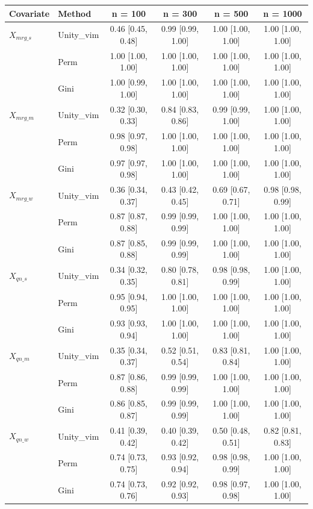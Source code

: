 
\begin{tabular}{llcccc}
\toprule
Covariate & Method & n = 100 & n = 300 & n = 500 & n = 1000\\
\midrule
$X_{mrg\_s}$ & Unity\_vim & 0.46 [0.45, 0.48] & 0.99 [0.99, 1.00] & 1.00 [1.00, 1.00] & 1.00 [1.00, 1.00]\\
 & Perm & 1.00 [1.00, 1.00] & 1.00 [1.00, 1.00] & 1.00 [1.00, 1.00] & 1.00 [1.00, 1.00]\\
 & Gini & 1.00 [0.99, 1.00] & 1.00 [1.00, 1.00] & 1.00 [1.00, 1.00] & 1.00 [1.00, 1.00]\\
$X_{mrg\_m}$ & Unity\_vim & 0.32 [0.30, 0.33] & 0.84 [0.83, 0.86] & 0.99 [0.99, 1.00] & 1.00 [1.00, 1.00]\\
 & Perm & 0.98 [0.97, 0.98] & 1.00 [1.00, 1.00] & 1.00 [1.00, 1.00] & 1.00 [1.00, 1.00]\\
 & Gini & 0.97 [0.97, 0.98] & 1.00 [1.00, 1.00] & 1.00 [1.00, 1.00] & 1.00 [1.00, 1.00]\\
$X_{mrg\_w}$ & Unity\_vim & 0.36 [0.34, 0.37] & 0.43 [0.42, 0.45] & 0.69 [0.67, 0.71] & 0.98 [0.98, 0.99]\\
 & Perm & 0.87 [0.87, 0.88] & 0.99 [0.99, 0.99] & 1.00 [1.00, 1.00] & 1.00 [1.00, 1.00]\\
 & Gini & 0.87 [0.85, 0.88] & 0.99 [0.99, 0.99] & 1.00 [1.00, 1.00] & 1.00 [1.00, 1.00]\\
$X_{qn\_s}$ & Unity\_vim & 0.34 [0.32, 0.35] & 0.80 [0.78, 0.81] & 0.98 [0.98, 0.99] & 1.00 [1.00, 1.00]\\
 & Perm & 0.95 [0.94, 0.95] & 1.00 [1.00, 1.00] & 1.00 [1.00, 1.00] & 1.00 [1.00, 1.00]\\
 & Gini & 0.93 [0.93, 0.94] & 1.00 [1.00, 1.00] & 1.00 [1.00, 1.00] & 1.00 [1.00, 1.00]\\
$X_{qn\_m}$ & Unity\_vim & 0.35 [0.34, 0.37] & 0.52 [0.51, 0.54] & 0.83 [0.81, 0.84] & 1.00 [1.00, 1.00]\\
 & Perm & 0.87 [0.86, 0.88] & 0.99 [0.99, 0.99] & 1.00 [1.00, 1.00] & 1.00 [1.00, 1.00]\\
 & Gini & 0.86 [0.85, 0.87] & 0.99 [0.99, 0.99] & 1.00 [1.00, 1.00] & 1.00 [1.00, 1.00]\\
$X_{qn\_w}$ & Unity\_vim & 0.41 [0.39, 0.42] & 0.40 [0.39, 0.42] & 0.50 [0.48, 0.51] & 0.82 [0.81, 0.83]\\
 & Perm & 0.74 [0.73, 0.75] & 0.93 [0.92, 0.94] & 0.98 [0.98, 0.99] & 1.00 [1.00, 1.00]\\
 & Gini & 0.74 [0.73, 0.76] & 0.92 [0.92, 0.93] & 0.98 [0.97, 0.98] & 1.00 [1.00, 1.00]\\

\end{tabular}
